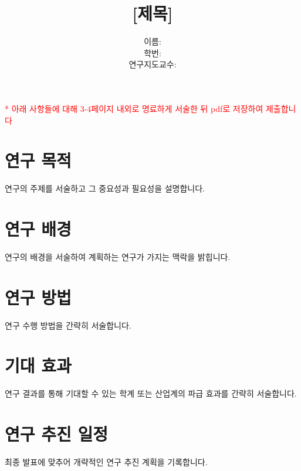 \documentclass{article}
\title{[제목]}
\author{이름:\\학번:\\연구지도교수:}
\date{}
\begin{document}
\maketitle\thispagestyle{fancy}

\noindent\makebox[\linewidth]{\rule{\textwidth}{0.4pt}}

\begin{center}
\textcolor{red}{* 아래 사항들에 대해 3-4페이지 내외로 명료하게 서술한 뒤 pdf로 저장하여 제출합니다}
\end{center}

\section{연구 목적}
연구의 주제를 서술하고 그 중요성과 필요성을 설명합니다.

\section{연구 배경}
연구의 배경을 서술하여 계획하는 연구가 가지는 맥락을 밝힙니다. 

\section{연구 방법}
연구 수행 방법을 간략히 서술합니다.

\section{기대 효과}
연구 결과를 통해 기대할 수 있는 학계 또는 산업계의 파급 효과를 간략히 서술합니다. 

\section{연구 추진 일정}
최종 발표에 맞추어 개략적인 연구 추진 계획을 기록합니다.




\end{document}
